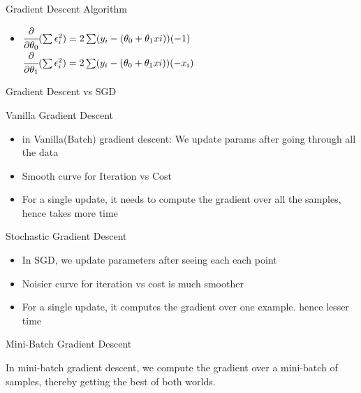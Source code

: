 \documentclass{beamer}
\begin{document}
\begin{frame}{Gradient Descent Algorithm}
    
    \begin{itemize}
        \item $\cfrac{\partial}{\partial \theta_{0}} (\sum \epsilon_{i}^{2}) = 2\sum (y_{i} - (\theta_{0} + \theta_{1}x{i}))(-1)$
        $\cfrac{\partial}{\partial \theta_{1}} (\sum \epsilon_{i}^{2}) = 2\sum (y_{i} - (\theta_{0} + \theta_{1}x{i}))(-x_{i})$
    \end{itemize}
\end{frame}


\begin{frame}{Gradient Descent vs SGD}
    
    
    
    Vanilla Gradient Descent
    \begin{itemize}
        \item 
        in Vanilla(Batch) gradient descent: We update params after going through all the data 
        \item Smooth curve for Iteration vs Cost
        \item For a single update, it needs to compute the gradient over all the samples, hence takes more time

    \end{itemize}
    
    Stochastic Gradient Descent
    \begin{itemize}
        \item In SGD, we update parameters after seeing each each point
        \item Noisier curve for iteration vs cost is much smoother
        \item  For a single update, it computes the gradient over one example. hence lesser time
    \end{itemize}
    
      
\end{frame}

\begin{frame}{Mini-Batch Gradient Descent}
    
    In mini-batch gradient descent, we compute the gradient over a mini-batch of samples, thereby getting the best of both worlds.
    
\end{frame}
\end{document}
